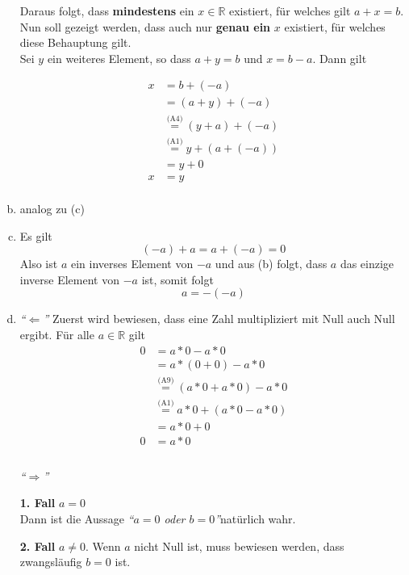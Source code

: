 \documentclass{article}
\begin{document}
\begin{enumerate}[(a)]
  Daraus folgt, dass \textbf{mindestens} ein $x \in \mathbb{R}$ existiert, für welches gilt $a + x = b$.
  Nun soll gezeigt werden, dass auch nur \textbf{genau ein} $x$ existiert, für welches diese Behauptung
  gilt. \\

  Sei $y$ ein weiteres Element, so dass $a + y = b$ und $x = b - a$.
  Dann gilt

  \begin{align*}
    x &= b + (-a) \\
      &= (a + y) + (-a) \\
      &\overset{\text{(A4)}}= (y + a) + (-a) \\
      &\overset{\text{(A1)}}= y + (a + (-a)) \\
      &= y + 0 \\
    x &= y \\
  \end{align*}
\item analog zu (c)
\item Es gilt
  \[
    (-a) + a = a + (-a) = 0
  \]
  Also ist $a$ ein inverses Element von $-a$ und aus (b) folgt, dass $a$ das einzige inverse Element von $-a$
  ist, somit folgt
  \[
    a = -(-a)
  \]
\item \emph{``$\Leftarrow$''} Zuerst wird bewiesen, dass eine Zahl multipliziert mit Null auch Null ergibt.
  Für alle $a \in \mathbb{R}$ gilt
  \begin{align*}
    0 &= a * 0 - a * 0 \\
      &= a * (0 + 0) - a * 0 \\
      &\overset{\text{(A9)}}= (a * 0 + a * 0) - a * 0 \\
      &\overset{\text{(A1)}}= a * 0 + (a * 0 - a * 0) \\
      &= a * 0 + 0 \\
    0 &= a * 0 \\
  \end{align*} \\
  \emph{``$\Rightarrow$''} \\
  \begin{minipage}[t]{.4\textwidth}
    \textbf{1. Fall} $a = 0$ \\
    Dann ist die Aussage \emph{``$a = 0$ oder $b = 0$''}natürlich wahr.
  \end{minipage}
  \hfill
  \vrule
  \hfill
  \begin{minipage}[t]{.4\textwidth}
    \textbf{2. Fall} $a \ne 0$. Wenn $a$ nicht Null ist, muss bewiesen werden, dass zwangsläufig $b = 0$ ist.

\end{minipage}
\end{enumerate}
\end{document}
